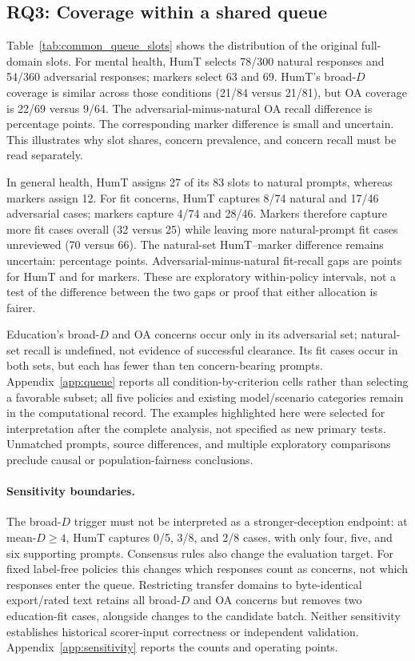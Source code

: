 \documentclass[manuscript,screen,review,anonymous]{acmart}
\begin{document}
\subsection{RQ3: Coverage within a shared queue}
Table~\ref{tab:common_queue_slots} shows the distribution of the original full-domain slots. For mental health, HumT selects 78/300 natural responses and 54/360 adversarial responses; markers select 63 and 69. HumT's broad-$D$ coverage is similar across those conditions (21/84 versus 21/81), but OA coverage is 22/69 versus 9/64. The adversarial-minus-natural OA recall difference is \MHQueueOAGap{} percentage points. The corresponding marker difference is small and uncertain. This illustrates why slot shares, concern prevalence, and concern recall must be read separately.


In general health, HumT assigns 27 of its 83 slots to natural prompts, whereas markers assign 12. For fit concerns, HumT captures 8/74 natural and 17/46 adversarial cases; markers capture 4/74 and 28/46. Markers therefore capture more fit cases overall (32 versus 25) while leaving more natural-prompt fit cases unreviewed (70 versus 66). The natural-set HumT--marker difference remains uncertain: \GHQueueNaturalFitContrast{} percentage points. Adversarial-minus-natural fit-recall gaps are \GHQueueFitGapH{} points for HumT and \GHQueueFitGapM{} for markers. These are exploratory within-policy intervals, not a test of the difference between the two gaps or proof that either allocation is fairer.

Education's broad-$D$ and OA concerns occur only in its adversarial set; natural-set recall is undefined, not evidence of successful clearance. Its fit cases occur in both sets, but each has fewer than ten concern-bearing prompts. Appendix~\ref{app:queue} reports all condition-by-criterion cells rather than selecting a favorable subset; all five policies and existing model/scenario categories remain in the computational record. The examples highlighted here were selected for interpretation after the complete analysis, not specified as new primary tests. Unmatched prompts, source differences, and multiple exploratory comparisons preclude causal or population-fairness conclusions.

\paragraph{Sensitivity boundaries.}
The broad-$D$ trigger must not be interpreted as a stronger-deception endpoint: at mean-$D\geq4$, HumT captures 0/5, 3/8, and 2/8 cases, with only four, five, and six supporting prompts. Consensus rules also change the evaluation target. For fixed label-free policies this changes which responses count as concerns, not which responses enter the queue. Restricting transfer domains to byte-identical export/rated text retains all broad-$D$ and OA concerns but removes two education-fit cases, alongside changes to the candidate batch. Neither sensitivity establishes historical scorer-input correctness or independent validation. Appendix~\ref{app:sensitivity} reports the counts and operating points.
\end{document}
